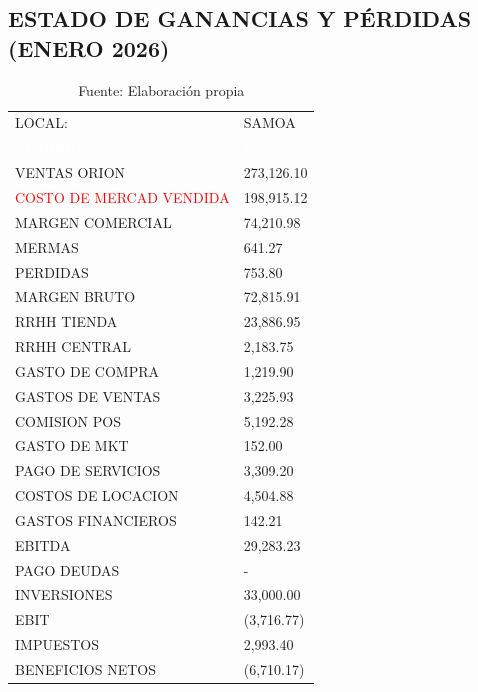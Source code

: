 \subsection*{ESTADO DE GANANCIAS Y PÉRDIDAS (ENERO 2026)}

\begin{table}[H]
	\centering
	\begin{tabular}{|L{8cm}|R{4cm}|}
	\hline
	 LOCAL: &  SAMOA \\ 
	\textcolor{white}{PERIODO:} & \textcolor{white}{Ene-26} \\ \hline
	 VENTAS ORION & 273,126.10 \\ 
	\textcolor{red}{COSTO DE MERCAD VENDIDA} & 198,915.12 \\ 
	 MARGEN COMERCIAL & 74,210.98 \\ 
	MERMAS & 641.27 \\ 
	PERDIDAS & 753.80 \\ 
	 MARGEN BRUTO & 72,815.91 \\ 
	RRHH TIENDA & 23,886.95 \\ 
	RRHH CENTRAL & 2,183.75 \\ 
	GASTO DE COMPRA & 1,219.90 \\ 
	GASTOS DE VENTAS & 3,225.93 \\ 
	COMISION POS & 5,192.28 \\ 
	GASTO DE MKT & 152.00 \\ 
	PAGO DE SERVICIOS & 3,309.20 \\ 
	COSTOS DE LOCACION & 4,504.88 \\ 
	GASTOS FINANCIEROS & 142.21 \\ 
	 EBITDA & 29,283.23 \\ 
	PAGO DEUDAS & - \\ 
	INVERSIONES & 33,000.00 \\ 
	 EBIT & (3,716.77) \\ 
	IMPUESTOS & 2,993.40 \\ 
	 BENEFICIOS NETOS & (6,710.17) \\ \hline
	\end{tabular}
\caption{Fuente: Elaboración propia}
\end{table}

\vspace{1cm} %


